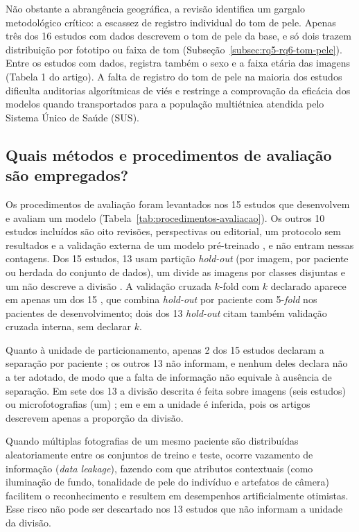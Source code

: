 Não obstante a abrangência geográfica, a revisão identifica um gargalo metodológico crítico:
a escassez de registro individual do tom de pele. Apenas três dos 16 estudos com dados
descrevem o tom de pele da base, e só dois trazem distribuição por fototipo ou faixa de tom
(Subseção~\ref{subsec:rq5-rq6-tom-pele}). Entre os estudos com dados,  registra também
o sexo e a faixa etária das imagens (Tabela 1 do artigo). A falta de registro do tom de pele na maioria dos
estudos dificulta
auditorias algorítmicas de viés e restringe a comprovação da eficácia dos modelos quando
transportados para a população multiétnica atendida pelo Sistema Único de Saúde (SUS).

\subsection{Quais métodos e procedimentos de avaliação são empregados?}
\label{subsec:rq3-metodos}

Os procedimentos de avaliação foram levantados nos 15 estudos que desenvolvem e avaliam um
modelo (Tabela~\ref{tab:procedimentos-avaliacao}). Os outros 10 estudos incluídos são oito revisões, perspectivas ou
editorial, um protocolo sem resultados  e a validação externa de um modelo
pré-treinado , e não entram nessas contagens. Dos 15 estudos, 13 usam partição
\textit{hold-out} (por imagem, por paciente ou herdada do conjunto de dados), um divide as imagens por
classes disjuntas  e um não descreve a divisão . A validação cruzada
$k$-fold com $k$ declarado aparece em apenas um dos 15 , que combina \textit{hold-out}
por paciente com 5-\textit{fold} nos pacientes de desenvolvimento; dois dos 13 \textit{hold-out} citam também
validação cruzada interna, sem declarar $k$.

Quanto à unidade de particionamento, apenas 2 dos 15 estudos declaram a separação por paciente
; os outros 13 não informam, e nenhum deles declara não a ter adotado, de modo que
a falta de informação não equivale à ausência de separação. Em sete dos 13 a divisão descrita é feita sobre
imagens (seis estudos) ou microfotografias (um) ;
em  e em  a unidade é inferida, pois os artigos descrevem apenas a proporção da divisão.

Quando múltiplas fotografias de um mesmo paciente são distribuídas aleatoriamente entre os
conjuntos de treino e teste, ocorre vazamento de informação (\textit{data leakage}), fazendo
com que atributos contextuais (como iluminação de fundo, tonalidade de pele do indivíduo e
artefatos de câmera) facilitem o reconhecimento e resultem em desempenhos artificialmente
otimistas. Esse risco não pode ser descartado nos 13 estudos que não informam a unidade da divisão.

